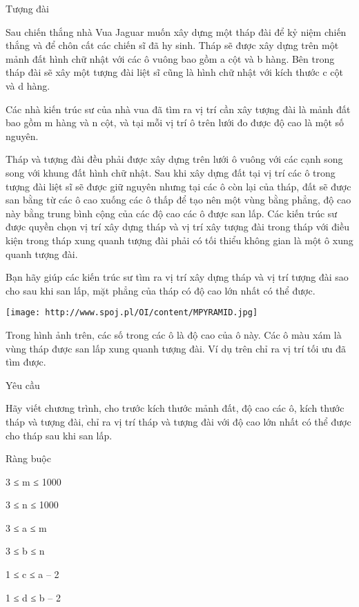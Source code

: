 



     Tượng đài    

   Sau chiến thắng nhà Vua Jaguar muốn xây dựng một tháp đài để kỷ niệm chiến thắng và để chôn cất các chiến sĩ đã hy sinh. Tháp sẽ được xây dựng trên một mảnh đất hình chữ nhật với các ô vuông bao gồm a cột và b hàng. Bên trong tháp đài sẽ xây một tượng đài liệt sĩ cũng là hình chữ nhật với kích thước c cột và d hàng.  

   Các nhà kiến trúc sư của nhà vua đã tìm ra vị trí cần xây tượng đài là mảnh đất bao gồm m hàng và n cột, và tại mỗi vị trí ô trên lưới đo được độ cao là một số nguyên.        

   Tháp và tượng đài đều phải được xây dựng trên lưới ô vuông với các cạnh song song với khung đất hình chữ nhật. Sau khi xây dựng đất tại vị trí các ô trong tượng đài liệt sĩ sẽ được giữ nguyên nhưng tại các ô còn lại của tháp, đất sẽ được san bằng từ các ô cao xuống các ô thấp để tạo nên một vùng bằng phẳng, độ cao này bằng trung bình cộng của các độ cao các ô được san lấp. Các kiến trúc sư được quyền chọn vị trí xây dựng tháp và vị trí xây tượng đài trong tháp với điều kiện trong tháp xung quanh tượng đài phải có tối thiểu không gian là một ô xung quanh tượng đài.        

   Bạn hãy giúp các kiến trúc sư tìm ra vị trí xây dựng tháp và vị trí tượng đài sao cho sau khi san lấp, mặt phẳng của tháp có độ cao lớn nhất có thể được.        


\texttt{[image: http://www.spoj.pl/OI/content/MPYRAMID.jpg]}

   Trong hình ảnh trên, các số trong các ô là độ cao của ô này. Các ô màu xám là vùng tháp được san lấp xung quanh tượng đài. Ví dụ trên chỉ ra vị trí tối ưu đã tìm được.        

       Yêu cầu           

   Hãy viết chương trình, cho trước kích thước mảnh đất, độ cao các ô, kích thước tháp và tượng đài, chỉ ra vị trí tháp và tượng đài với độ cao lớn nhất có thể được cho tháp sau khi san lấp.        

       Ràng buộc           

   3 ≤ m ≤ 1000        

   3 ≤ n ≤ 1000        

   3 ≤ a ≤ m        

   3 ≤ b ≤ n        

   1 ≤ c ≤ a – 2        

   1 ≤ d ≤ b – 2        

